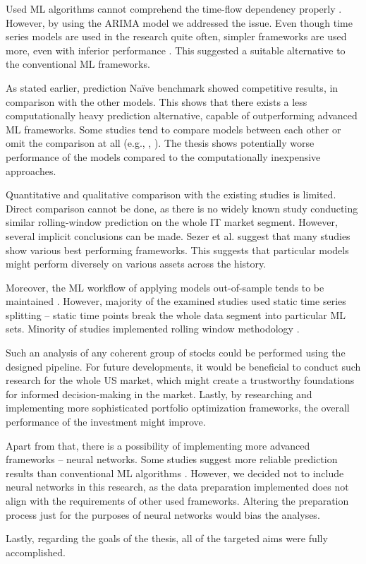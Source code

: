 Used ML algorithms cannot comprehend the time-flow dependency properly \cite{forecast_book}. However, by using the ARIMA model we addressed the issue. Even though time series models are used in the research quite often, simpler frameworks are used more, even with inferior performance \cite{review}. This suggested a suitable alternative to the conventional ML frameworks. 

As stated earlier, prediction Naïve benchmark showed competitive results, in comparison with the other models. This shows that there exists a less computationally heavy prediction alternative, capable of outperforming advanced ML frameworks. Some studies tend to compare models between each other \cite{review} or omit the comparison at all (e.g., \cite{vijh}, \cite{zhao}). The thesis shows potentially
worse performance of the models compared to the computationally inexpensive approaches.

Quantitative and qualitative comparison with the existing studies is limited. Direct comparison cannot be done, as there is no widely known study conducting similar rolling-window prediction on the whole IT market segment. However, several implicit conclusions can be made.
Sezer et al. \cite{review} suggest that many studies show various best performing frameworks. This suggests that particular models might perform diversely on various assets across the history.

Moreover, the ML workflow of applying models out-of-sample tends to be maintained \cite{krauss,review,zhao}. However, majority of the examined studies used static time series splitting – static time points break the whole data segment into particular ML sets. Minority of studies implemented rolling window methodology \cite{review}. 
\newline
\par
Such an analysis of any coherent group of stocks could be performed using the designed pipeline. For future developments, it would be beneficial to conduct such research for the whole US market, which might 
create a trustworthy foundations for informed decision-making in the market. Lastly, by researching and implementing more sophisticated portfolio optimization frameworks, the overall performance of the investment 
might improve.

Apart from that, there is a possibility of implementing more advanced frameworks – neural networks. Some studies suggest more reliable prediction results than conventional ML algorithms \cite{review}. However, we decided not to include neural networks in this research, as the data preparation implemented does not align with the requirements of other used frameworks. Altering the preparation process 
just for the purposes of neural networks would bias the analyses. 

Lastly, regarding the goals of the thesis, all of the targeted aims were fully accomplished.